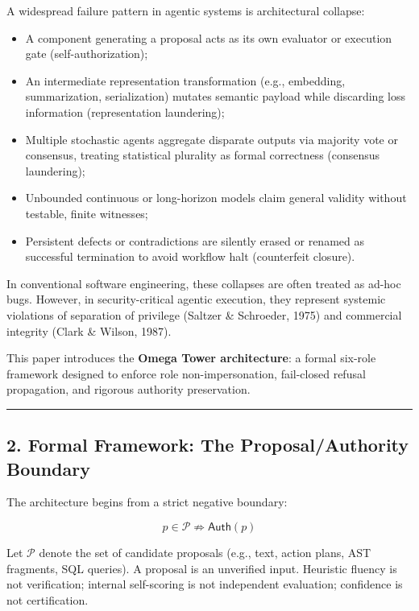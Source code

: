 \documentclass[
  10pt,
]{article}
\begin{document}
A widespread failure pattern in agentic systems is architectural collapse:

\begin{itemize}
\item
  A component generating a proposal acts as its own evaluator or execution gate (self-authorization);
\item
  An intermediate representation transformation (e.g., embedding, summarization, serialization) mutates semantic payload while discarding loss information (representation laundering);
\item
  Multiple stochastic agents aggregate disparate outputs via majority vote or consensus, treating statistical plurality as formal correctness (consensus laundering);
\item
  Unbounded continuous or long-horizon models claim general validity without testable, finite witnesses;
\item
  Persistent defects or contradictions are silently erased or renamed as successful termination to avoid workflow halt (counterfeit closure).
\end{itemize}

In conventional software engineering, these collapses are often treated as ad-hoc bugs. However, in security-critical agentic execution, they represent systemic violations of separation of privilege (Saltzer \& Schroeder, 1975) and commercial integrity (Clark \& Wilson, 1987).

This paper introduces the \textbf{Omega Tower architecture}: a formal six-role framework designed to enforce role non-impersonation, fail-closed refusal propagation, and rigorous authority preservation.

\begin{center}\rule{0.5\linewidth}{0.5pt}\end{center}

\subsection{2. Formal Framework: The Proposal/Authority Boundary}\label{formal-framework-the-proposalauthority-boundary}

The architecture begins from a strict negative boundary:

\hypertarget{math-E0002-0002}{}{\[\boxed{ p \in \mathcal{P} \not\Rightarrow \mathsf{Auth}(p) }\]}

Let \hypertarget{math-E0003-0003}{}{\(\mathcal{P}\)} denote the set of candidate proposals (e.g., text, action plans, AST fragments, SQL queries). A proposal is an unverified input. Heuristic fluency is not verification; internal self-scoring is not independent evaluation; confidence is not certification.
\end{document}
